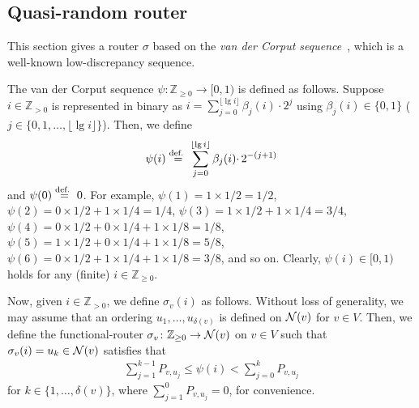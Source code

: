 \documentclass[letter, 11pt]{article}
\newcommand{\defeq}{\stackrel{\mbox{\scriptsize{\normalfont\rmfamily def. }}}{=}}
\newcommand{\1}{\mbox{1}\hspace{-0.25em}\mbox{l}}
\begin{document}
\subsection{Quasi-random router}\label{sec:vander}This section gives a router $\sigma$ 
  based on the {\em van der Corput sequence}~\cite{JGV35,N78}, 
 which is a well-known low-discrepancy sequence. 

The van der Corput sequence $\psi \colon \mathbb{Z}_{\geq 0} \to [0, 1)$ is defined as follows.  
Suppose $i \in \mathbb{Z}_{> 0}$ 
  is represented in binary as $i=\sum^{\lfloor \lg i \rfloor}_{j=0} \beta_j(i) \cdotp 2^j$ 
  using $\beta_j(i) \in \{0, 1\}$ ($j \in \{0, 1, \ldots, \lfloor \lg i \rfloor\}$). 
 Then, we define  
\begin{eqnarray}
  \psi(i) \defeq \sum^{\lfloor \lg i \rfloor}_{j=0} \beta_j(i) \cdotp 2^{-(j+1)}
\label{eq:def-psi}
\end{eqnarray}
and $\psi(0) \defeq 0$. 
 For example, 
$\psi(1) = 1 \times 1/2 = 1/2$, 
$\psi(2) = 0 \times 1/2 + 1 \times 1/4 = 1/4$, 
$\psi(3) = 1 \times 1/2 + 1 \times 1/4 = 3/4$, 
$\psi(4) = 0 \times 1/2 + 0 \times 1/4 + 1 \times 1/8 = 1/8$, 
$\psi(5) = 1 \times 1/2 + 0 \times 1/4 + 1 \times 1/8 = 5/8$, 
$\psi(6) = 0 \times 1/2 + 1 \times 1/4 + 1 \times 1/8 = 3/8$, 
and so on. 
 Clearly, $\psi(i) \in [0, 1)$ holds for any (finite) $i \in \mathbb{Z}_{\geq 0}$. 


Now, given $i \in \mathbb{Z}_{> 0}$, we define $\sigma_v(i)$ as follows.
 Without loss of generality, 
  we may assume that an ordering $u_1, \ldots, u_{\delta(v)}$ is defined on ${\cal N}(v)$ for $v \in V$. 
 Then, 
  we define the functional-router $\sigma_v \colon \mathbb{Z}_{\geq 0} \to {\cal N}(v)$ on $v \in V$ 
  such that $\sigma_v(i) = u_k \in {\cal N}(v)$ satisfies that 
\begin{eqnarray*} \textstyle
  \sum_{j=1}^{k-1}P_{v, u_j} \leq  \psi(i) < \sum_{j=0}^{k}P_{v, u_j}  
\end{eqnarray*}
  for $k \in \{1, \ldots, \delta(v)\}$, 
 where $\sum_{j=1}^0 P_{v, u_j}=0$, for convenience. 
\end{document}

